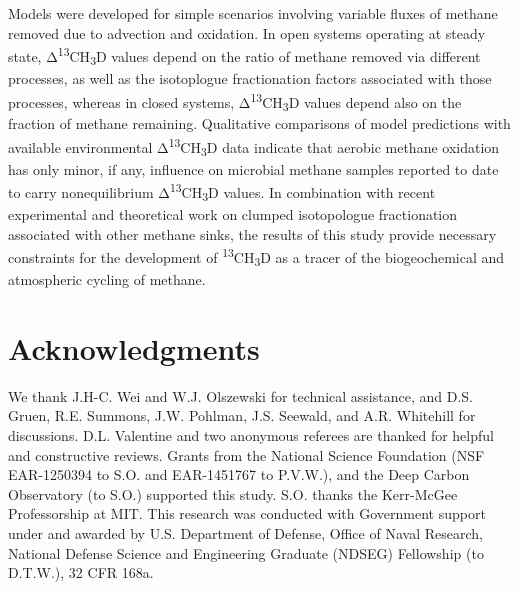Models were developed for simple scenarios involving variable fluxes of
methane removed due to advection and oxidation. In open systems
operating at steady state, Δ\textsuperscript{13}CH\textsubscript{3}D
values depend on the ratio of methane removed via different processes,
as well as the isotoplogue fractionation factors associated with those
processes, whereas in closed systems,
Δ\textsuperscript{13}CH\textsubscript{3}D values depend also on the
fraction of methane remaining. Qualitative comparisons of model
predictions with available environmental
Δ\textsuperscript{13}CH\textsubscript{3}D data indicate that aerobic
methane oxidation has only minor, if any, influence on microbial methane
samples reported to date to carry nonequilibrium
Δ\textsuperscript{13}CH\textsubscript{3}D values. In combination with
recent experimental and theoretical work on clumped isotopologue
fractionation associated with other methane sinks, the results of this
study provide necessary constraints for the development of
\textsuperscript{13}CH\textsubscript{3}D as a tracer of the
biogeochemical and atmospheric cycling of methane.

\section*{Acknowledgments}

We thank J.H-C. Wei and W.J. Olszewski for technical assistance, and
D.S. Gruen, R.E. Summons, J.W. Pohl\-man, J.S. Seewald, and A.R. Whitehill
for discussions. D.L. Valentine and two anonymous referees are thanked
for helpful and constructive reviews. Grants from the National Science
Foundation (NSF EAR-1250394 to S.O. and EAR-1451767 to P.V.W.), and the
Deep Carbon Observatory (to S.O.) supported this study. S.O. thanks the
Kerr-McGee Professorship at MIT. This research was conducted with
Government support under and awarded by U.S. Department of Defense,
Office of Naval Research, National Defense Science and Engineering
Graduate (NDSEG) Fellowship (to D.T.W.), 32 CFR 168a.






